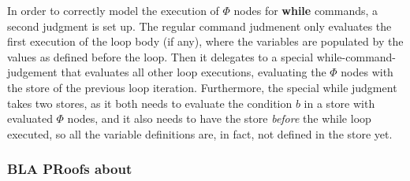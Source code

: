 In order to correctly model the execution of $\Phi$ nodes for \textbf{while} commands,
a second judgment is set up.
The regular command judmenent only evaluates the first execution of the loop body
(if any), where the variables are populated by the values as defined before the loop.
Then it delegates to a special while-command-judgement that evaluates all other 
loop executions, evaluating the $\Phi$ nodes with the store of the previous loop 
iteration.
Furthermore, the special while judgment takes two stores, as it both needs to evaluate
the condition $b$ in a store with evaluated $\Phi$ nodes, and it also needs to have
the store \emph{before} the while loop executed, so all the variable definitions are,
in fact, not defined in the store yet.

\subsubsection*{BLA PRoofs about }

